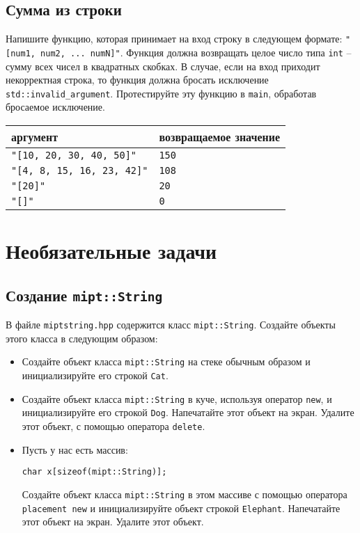 \documentclass{article}
\begin{document}
\subsection{Сумма из строки}
Напишите функцию, которая принимает на вход строку в следующем формате: \texttt{"[num1, num2, ... numN]"}.
Функция должна возвращать целое число типа \texttt{int} -- сумму всех чисел в квадратных скобках. В случае, если на вход приходит некорректная строка, то функция должна бросать исключение \texttt{std::invalid\_argument}. Протестируйте эту функцию в \texttt{main}, обработав бросаемое исключение.
\begin{center}
\begin{tabular}{ l | l }
 аргумент & возвращаемое значение \\ \hline
 \texttt{"[10, 20, 30, 40, 50]"} & \texttt{150} \\
 \texttt{"[4, 8, 15, 16, 23, 42]"} & \texttt{108}  \\ 
 \texttt{"[20]"} & \texttt{20} \\
 \texttt{"[]"} & \texttt{0} \\
\end{tabular}
\end{center}








\newpage
\section{Необязательные задачи}


\subsection{Создание \texttt{mipt::String}}
В файле \texttt{miptstring.hpp} содержится класс \texttt{mipt::String}. Создайте объекты этого класса в следующим образом:
\begin{itemize}
\item Создайте объект класса \texttt{mipt::String} на стеке обычным образом и инициализируйте его строкой \texttt{Cat}.
\item Создайте объект класса \texttt{mipt::String} в куче, используя оператор \texttt{new}, и инициализируйте его строкой \texttt{Dog}. Напечатайте этот объект на экран. Удалите этот объект, с помощью оператора \texttt{delete}.
\item Пусть у нас есть массив:
\begin{lstlisting}
char x[sizeof(mipt::String)];
\end{lstlisting}
Создайте объект класса \texttt{mipt::String} в этом массиве с помощью оператора \texttt{placement new} и инициализируйте объект строкой \texttt{Elephant}. Напечатайте этот объект на экран. Удалите этот объект.
\end{itemize}
\end{document}
